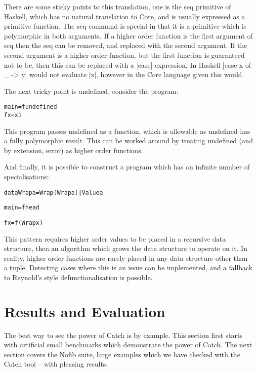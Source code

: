 \documentclass[preprint]{sigplanconf}
\newcommand{\C}[1]{\textsf{#1}}
\newenvironment{code}{\begin{alltt}\small}{\end{alltt}}
\begin{document}
There are some sticky points to this translation, one is the \C{seq} primitive of Haskell, which has no natural translation to Core, and is usually expressed as a primitive function. The \C{seq} command is special in that it is a primitive which is polymorphic in both arguments. If a higher order function is the first argument of \C{seq} then the \C{seq} can be removed, and replaced with the second argument. If the second argument is a higher order function, but the first function is guaranteed not to be, then this can be replaced with a |case| expression. In Haskell |case x of _ -> y| would not evaluate |x|, however in the Core language given this would.

The next tricky point is \C{undefined}, consider the program:

\begin{code}
main = f undefined
f x = x 1
\end{code}

This program passes \C{undefined} as a function, which is allowable as \C{undefined} has a fully polymorphic result. This can be worked around by treating \C{undefined} (and by extension, \C{error}) as higher order functions.

And finally, it is possible to construct a program which has an infinite number of specialisations:

\begin{code}
data Wrap a = Wrap (Wrap a) | Value a

main = f head

f x = f (Wrap x)
\end{code}

This pattern requires higher order values to be placed in a recursive data structure, then an algorithm which grows the data structure to operate on it. In reality, higher order functions are rarely placed in any data structure other than a tuple. Detecting cases where this is an issue can be implemented, and a fallback to Reynold's style defunctionalisation is possible.

\section{Results and Evaluation}
\label{sec:results}

The best way to see the power of Catch is by example. This section first starts with artificial small benchmarks which demonstrate the power of Catch. The next section covers the Nofib suite, large examples which we have checked with the Catch tool -- with pleasing results.
\end{document}
